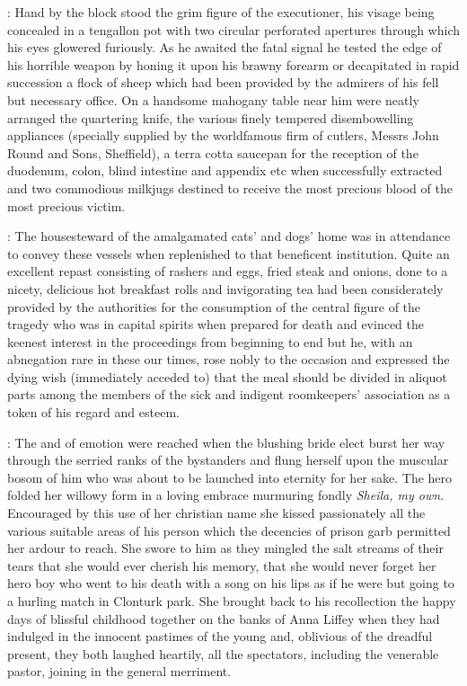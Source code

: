 :
Hand by the block stood
the grim figure of the executioner, his visage being concealed in a
tengallon pot with two circular perforated apertures through which
his eyes glowered furiously. As he awaited the fatal signal he
tested the edge of his horrible weapon by honing it upon his
brawny forearm or decapitated in rapid succession a flock of
sheep which had been provided by the admirers of his fell but necessary
office. On a handsome mahogany table near him were neatly arranged the
quartering knife, the various finely tempered disembowelling appliances
(specially supplied by the worldfamous firm of cutlers,
Messrs John Round
and Sons, Sheffield), a terra cotta saucepan for the reception of the
duodenum, colon, blind intestine and appendix etc when successfully
extracted and two commodious milkjugs destined to receive the most
precious blood of the most precious victim.

:
The housesteward of the
amalgamated cats' and dogs' home was in attendance to convey these
vessels when replenished to that beneficent institution. Quite an
excellent repast consisting of rashers and eggs, fried steak and onions,
done to a nicety, delicious hot breakfast rolls and invigorating tea had
been considerately provided by the authorities for the consumption
of the central figure of the tragedy
who was in capital spirits
when prepared for death and evinced the keenest interest in the
proceedings from beginning to end but he, with an abnegation rare
in these our times, rose nobly to the occasion and expressed the
dying wish (immediately acceded to) that the meal should be
divided in aliquot parts among the members of the sick and indigent
roomkeepers' association as a token of his regard and esteem.

:
The  and 
of emotion were reached when the blushing bride elect burst
her way through the serried ranks of the bystanders and flung herself upon
the muscular bosom of him who was about to be launched into eternity for
her sake. The hero folded her willowy form in a loving embrace murmuring
fondly \emph{Sheila, my own}.
Encouraged by this use of her christian name she
kissed passionately all the various suitable areas of his person which the
decencies of prison garb permitted her ardour to reach. She swore to him
as they mingled the salt streams of their tears that she would ever
cherish his memory, that she would never forget her hero boy who went to
his death with a song on his lips as if he were but going to a hurling
match in Clonturk park. She brought back to his recollection the happy
days of blissful childhood together on the banks of Anna Liffey when they
had indulged in the innocent pastimes of the young and, oblivious of the
dreadful present, they both laughed heartily, all the spectators,
including the venerable pastor,
joining in the general merriment.

